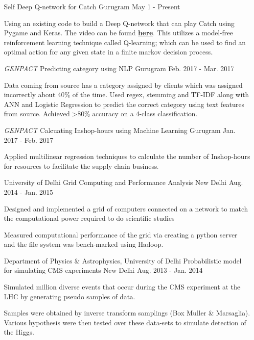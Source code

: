 \begin{cventries}	
	
  \cventry
  	{Self}
  	{Deep Q-network for Catch}
  	{Gurugram}
  	{May 1 - Present}
  	{
  		\begin{cvitems}
  			\item {Using an existing code to build a Deep Q-network that can play Catch using Pygame and Keras. The video can be found \href{https://goo.gl/qxjbgS}{\textbf{here}}. This utilizes a model-free reinforcement learning technique called Q-learning; which can be used to find an optimal action for any given state in a finite markov decision process.}
  		\end{cvitems}
  	}
  
  \cventry
	{\emph{GENPACT}}
	{Predicting category using NLP}
	{Gurugram}
	{Feb. 2017 - Mar. 2017}
	{
		\begin{cvitems}
			\item {Data coming from source has a category assigned by clients which was assigned incorrectly about 40\% of the time. Used regex, stemming and TF-IDF along with ANN and Logistic Regression to predict the correct category using text features from source. Achieved >80\% accuracy on a 4-class classification.}
		\end{cvitems}
	}

  \cventry
	{\emph{GENPACT}}
	{Calcuating Inshop-hours using Machine Learning}
	{Gurugram}
	{Jan. 2017 - Feb. 2017}
	{
		\begin{cvitems}
			\item {Applied multilinear regression techniques to calculate the number of Inshop-hours for resources to facilitate the supply chain business.}
	\end{cvitems} 
	}

  \cventry
    {University of Delhi}
    {Grid Computing and Performance Analysis}
    {New Delhi}
    {Aug. 2014 - Jan. 2015}
    {
      \begin{cvitems}
        \item {Designed and implemented a grid of computers connected on a network to match the computational power required to do scientific studies}
        \item {Measured computational performance of the grid via creating a python server and the file system was bench-marked using Hadoop.}
      \end{cvitems}
    }
    
  \cventry
    {Department of Physics \& Astrophysics, University of Delhi}
    {Probabilistic model for simulating CMS experiments}
    {New Delhi}
    {Aug. 2013 - Jan. 2014}
    {
      \begin{cvitems}
        \item {Simulated million diverse events that occur during the CMS experiment at the LHC by generating pseudo samples of data.}
        \item {Samples were obtained by inverse transform samplings (Box Muller \& Marsaglia). Various hypothesis were then tested over these data-sets to simulate detection of the Higgs.}
      \end{cvitems}
    } 
    

\end{cventries}
